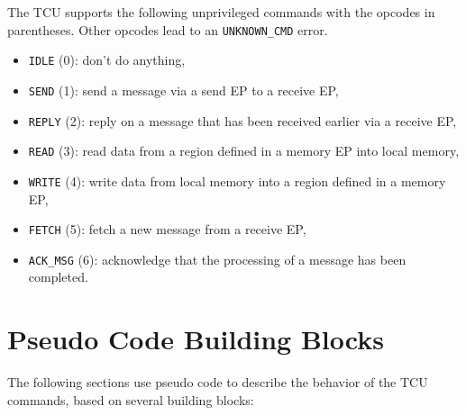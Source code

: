 The TCU supports the following unprivileged commands with the opcodes in parentheses. Other opcodes
lead to an \texttt{UNKNOWN\_CMD} error.

\begin{itemize}
  \item \texttt{IDLE} (0): don't do anything,
  \item \texttt{SEND} (1): send a message via a send EP to a receive EP,
  \item \texttt{REPLY} (2): reply on a message that has been received earlier via a receive EP,
  \item \texttt{READ} (3): read data from a region defined in a memory EP into local memory,
  \item \texttt{WRITE} (4): write data from local memory into a region defined in a memory EP,
  \item \texttt{FETCH} (5): fetch a new message from a receive EP,
  \item \texttt{ACK\_MSG} (6): acknowledge that the processing of a message has been completed.
\end{itemize}

\section{Pseudo Code Building Blocks}
\label{sec:unprivcmdspseudo}

The following sections use pseudo code to describe the behavior of the TCU commands, based on
several building blocks:

